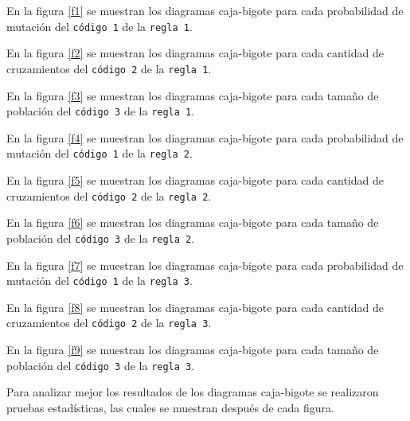 \documentclass{article}
\begin{document}
En la figura \ref{f1} se muestran los diagramas caja-bigote para cada probabilidad de mutación del \texttt{código 1} de la \texttt{regla 1}.

En la figura \ref{f2} se muestran los diagramas caja-bigote para cada cantidad de cruzamientos del \texttt{código 2} de la \texttt{regla 1}.

En la figura \ref{f3} se muestran los diagramas caja-bigote para cada tamaño de población del \texttt{código 3} de la \texttt{regla 1}.
\bigskip

En la figura \ref{f4} se muestran los diagramas caja-bigote para cada probabilidad de mutación del \texttt{código 1} de la \texttt{regla 2}.

En la figura \ref{f5} se muestran los diagramas caja-bigote para cada cantidad de cruzamientos del \texttt{código 2} de la \texttt{regla 2}.

En la figura \ref{f6} se muestran los diagramas caja-bigote para cada tamaño de población del \texttt{código 3} de la \texttt{regla 2}.
\bigskip

En la figura \ref{f7} se muestran los diagramas caja-bigote para cada probabilidad de mutación del \texttt{código 1} de la \texttt{regla 3}.

En la figura \ref{f8} se muestran los diagramas caja-bigote para cada cantidad de cruzamientos del \texttt{código 2} de la \texttt{regla 3}.

En la figura \ref{f9} se muestran los diagramas caja-bigote para cada tamaño de población del \texttt{código 3} de la \texttt{regla 3}.
\bigskip

Para analizar mejor los resultados de los diagramas caja-bigote se realizaron pruebas estadísticas, las cuales se muestran después de cada figura.
\end{document}
